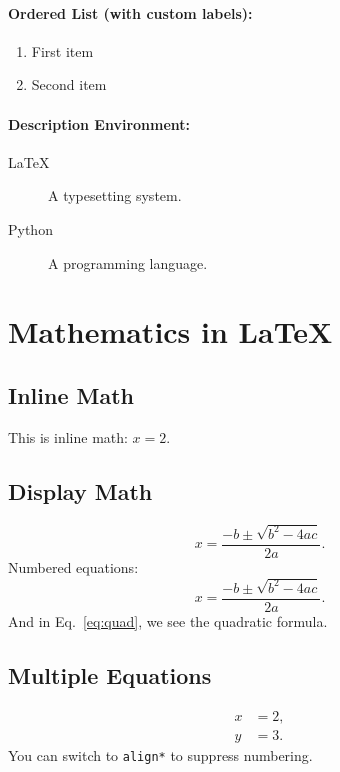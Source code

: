 \documentclass[12pt]{article}
\begin{document}
\paragraph{Ordered List (with custom labels):}
\begin{enumerate}[label=(\roman*)]
    \item First item
    \item Second item
\end{enumerate}

\paragraph{Description Environment:}
\begin{description}
    \item[LaTeX] A typesetting system.
    \item[Python] A programming language.
\end{description}

\section{Mathematics in \LaTeX}
\subsection{Inline Math}
This is inline math: $ x = 2 $.

\subsection{Display Math}
\[
   x = \frac{-b \pm \sqrt{b^2 - 4ac}}{2a}.
\]
Numbered equations:
\begin{equation}\label{eq:quad}
   x = \frac{-b \pm \sqrt{b^2 - 4ac}}{2a}.
\end{equation}
And in Eq.~\ref{eq:quad}, we see the quadratic formula.

\subsection{Multiple Equations}
\begin{align}
   x &= 2, \\
   y &= 3.
\end{align}
You can switch to \texttt{align*} to suppress numbering.
\end{document}
